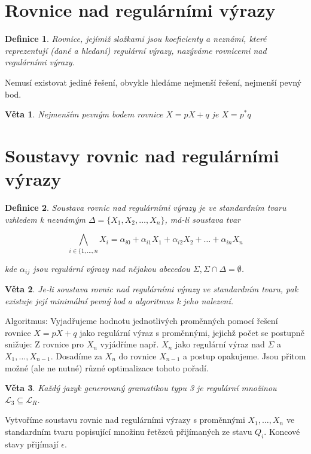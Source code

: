 \documentclass[a4paper, 11pt]{report}
\newtheorem{mydef}{Definice}[chapter]
\newtheorem{veta}{Věta}[chapter]
\begin{document}
\section{Rovnice nad regulárními výrazy}

\begin{mydef}
Rovnice, jejímiž složkami jsou koeficienty a neznámí, které reprezentují (dané a hledaní) regulární výrazy, nazýváme \emph{rovnicemi nad regulárními výrazy}.
\end{mydef}

Nemusí existovat jediné řešení, obvykle hledáme nejmenší řešení, nejmenší pevný bod.

\begin{veta}
Nejmenším pevným bodem rovnice $X = pX + q$ je $X = p^*q$
\end{veta}

\section{Soustavy rovnic nad regulárními výrazy}

\begin{mydef}
Soustava rovnic nad regulárními výrazy je ve \emph{standardním tvaru} vzhledem k neznámým $\Delta = \{X_1, X_2, \dots, X_n\}$, má-li soustava tvar

$$\bigwedge_{i \in \{1, \dots, n} X_i = \alpha_{i0} + \alpha_{i1}X_1 + \alpha_{i2}X_2 + \dots + \alpha_{in}X_n$$

kde $\alpha_{ij}$ jsou regulární výrazy nad nějakou abecedou $\Sigma, \Sigma \cap \Delta = \emptyset$.
\end{mydef}

\begin{veta}
Je-li soustava rovnic nad regulárními výrazy ve standardním tvaru, pak existuje její minimální pevný bod a algoritmus k jeho nalezení.
\end{veta}
Algoritmus: Vyjadřujeme hodnotu jednotlivých proměnných pomocí řešení rovnice $X=pX + q$ jako regulární výraz s proměnnými, jejichž počet se postupně snižuje:
Z rovnice pro $X_n$ vyjádříme např. $X_n$ jako regulární výraz nad $\Sigma$ a $X_1, \dots, X_{n-1}$.
Dosadíme za $X_n$ do rovnice $X_{n-1}$ a postup opakujeme.
Jsou přitom možné (ale ne nutné) různé optimalizace tohoto pořadí.

\begin{veta}
Každý jazyk generovaný gramatikou typu 3 je regulární množinou $\mathcal{L}_3 \subseteq \mathcal{L}_R$.
\end{veta}
Vytvoříme soustavu rovnic nad regulárními výrazy s proměnnými $X_1, \dots, X_n$ ve standardním tvaru popisující množinu řetězců přijímaných ze stavu $Q_i$. Koncové stavy přijímají $\epsilon$.
\end{document}
